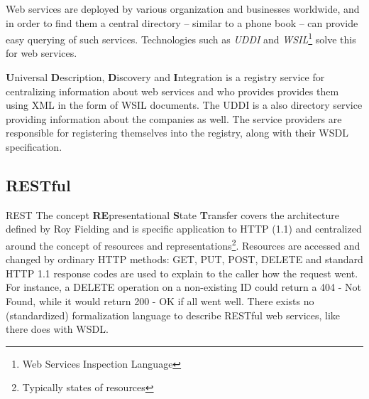 \noindent
Web services are deployed by various organization and businesses worldwide, and in order to find them a central directory -- similar to a phone book -- can provide easy querying of such services. Technologies such as \emph{UDDI} and \emph{WSIL}\footnote{Web Services Inspection Language} solve this for web services.

\textbf{U}niversal \textbf{D}escription, \textbf{D}iscovery and \textbf{I}ntegration is a registry service for centralizing information about web services and who provides provides them using XML in the form of WSIL documents. The UDDI is a also directory service providing information about the companies as well. The service providers are responsible for registering themselves into the registry, along with their WSDL specification.

\subsection{RESTful}
\mkt

\noindent
REST The concept \textbf{RE}presentational \textbf{S}tate \textbf{T}ransfer covers the architecture defined by Roy Fielding and is specific application to HTTP (1.1) and centralized around the concept of resources and representations\footnote{Typically states of resources}. Resources are accessed and changed by ordinary HTTP methods: GET, PUT, POST, DELETE and standard HTTP 1.1 response codes are used to explain to the caller how the request went. For instance, a DELETE operation on a non-existing ID could return a 404 - Not Found, while it would return 200 - OK if all went well. There exists no (standardized) formalization language to describe RESTful web services, like there does with WSDL.

